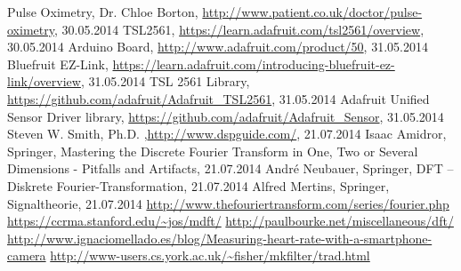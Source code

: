 \documentclass[notitlepage]{scrreprt}
\begin{document}
\begin{thebibliography}{999}
	 Pulse Oximetry, Dr. Chloe Borton, \url{http://www.patient.co.uk/doctor/pulse-oximetry}, 30.05.2014
	 TSL2561, \url{https://learn.adafruit.com/tsl2561/overview}, 30.05.2014
	 Arduino Board, \url{http://www.adafruit.com/product/50}, 31.05.2014
	 Bluefruit EZ-Link, \url{https://learn.adafruit.com/introducing-bluefruit-ez-link/overview}, 31.05.2014
	 TSL 2561 Library, \url{https://github.com/adafruit/Adafruit_TSL2561}, 31.05.2014
	 Adafruit Unified Sensor Driver library, \url{https://github.com/adafruit/Adafruit_Sensor}, 31.05.2014
	 Steven W. Smith, Ph.D. ,\url{http://www.dspguide.com/}, 21.07.2014
	 Isaac Amidror, Springer, Mastering the Discrete Fourier Transform in One, Two or Several Dimensions - Pitfalls and Artifacts, 21.07.2014
	 André Neubauer, Springer, DFT – Diskrete Fourier-Transformation, 21.07.2014
	 Alfred Mertins, Springer, Signaltheorie, 21.07.2014
	 \url{http://www.thefouriertransform.com/series/fourier.php}
	 \url{https://ccrma.stanford.edu/~jos/mdft/}
	 \url{http://paulbourke.net/miscellaneous/dft/}
	 \url{http://www.ignaciomellado.es/blog/Measuring-heart-rate-with-a-smartphone-camera}
	 \url{http://www-users.cs.york.ac.uk/~fisher/mkfilter/trad.html}
\end{thebibliography}
\end{document}
